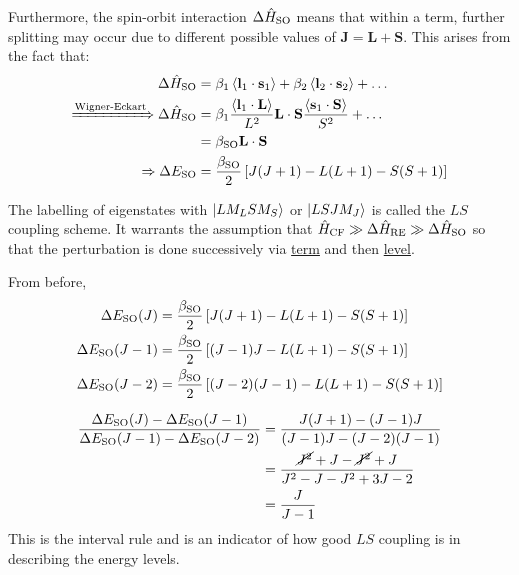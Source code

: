 \begin{parts}
	Furthermore, the spin-orbit interaction $\Delta\hat{H}_\textnormal{SO}$ means that within a term, further splitting may occur due to different possible values of $\mathbf{J} = \mathbf{L} + \mathbf{S}$.
	This arises from the fact that:
	\begin{align*}
		\Delta\hat{H}_\textnormal{SO} &= \beta_1\left\langle{}\mathbf{l}_1\cdot\mathbf{s}_1{}\right\rangle + \beta_2\left\langle{}\mathbf{l}_2\cdot\mathbf{s}_2{}\right\rangle + \ldots \\
		\xRightarrow{\textnormal{Wigner-Eckart}} \Delta\hat{H}_\textnormal{SO} &= \beta_1 \frac{\left\langle{}\mathbf{l}_1\cdot\mathbf{L}{}\right\rangle}{L^2}\mathbf{L} \cdot \mathbf{S}\frac{\left\langle{}\mathbf{s}_1\cdot\mathbf{S}{}\right\rangle}{S^2} + \ldots \\
		&= \beta_\textnormal{SO} \mathbf{L}\cdot\mathbf{S} \\
		\Rightarrow \Delta E_\textnormal{SO} &= \frac{\beta_\textnormal{SO}}{2} \left[J(J+1) - L(L+1) - S(S+1)\right]
	\end{align*}
	
	The labelling of eigenstates with $\ket{LM_L SM_S}$ or $\ket{LSJM_J}$ is called the $LS$ coupling scheme.
	It warrants the assumption that $\hat{H}_\textnormal{CF} \gg \Delta\hat{H}_\textnormal{RE} \gg \Delta\hat{H}_\textnormal{SO}$ so that the perturbation is done successively via \underline{term} and then \underline{level}.
	
	From before,
	\begin{align*}
		\Delta E_\textnormal{SO} (J) &= \frac{\beta_\textnormal{SO}}{2} \left[J(J+1) - L(L+1) - S(S+1)\right] \\
		\Delta E_\textnormal{SO} (J-1) &= \frac{\beta_\textnormal{SO}}{2} \left[(J-1)J - L(L+1) - S(S+1)\right] \\
		\Delta E_\textnormal{SO} (J-2) &= \frac{\beta_\textnormal{SO}}{2} \left[(J-2)(J-1) - L(L+1) - S(S+1)\right]
	\end{align*}
	
	\begin{align*}
		\frac{\Delta E_\textnormal{SO} (J) - \Delta E_\textnormal{SO} (J-1)}{\Delta E_\textnormal{SO} (J-1) - \Delta E_\textnormal{SO} (J-2)} &= \frac{J(J+1) - (J-1)J}{(J-1)J - (J-2)(J-1)} \\
		&= \frac{\cancel{J^2} + J - \cancel{J^2} + J}{J^2 - J - J^2 + 3J - 2} \\
		&= \frac{J}{J-1}
	\end{align*}
	This is the interval rule and is an indicator of how good $LS$ coupling is in describing the energy levels.
	

\end{parts}
